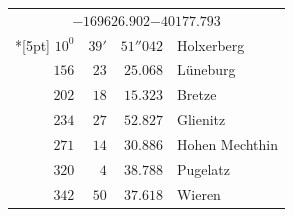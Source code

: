 \begin{longtable}{@{}rrrp{.61\linewidth}@{}}
\multicolumn{4}{c}{\(-169626.902\)\qquad\(-40177.793\)}\\*[5pt]
\(10^{0}\)&\(39'\)&\(51''042\)&\raggedright Holxerberg\tabularnewline
\(156\)&\(23\)&\(25.068\)&\raggedright Lüneburg\tabularnewline
\(202\)&\(18\)&\(15.323\)&\raggedright Bretze\tabularnewline
\(234\)&\(27\)&\(52.827\)&\raggedright Glienitz\tabularnewline
\(271\)&\(14\)&\(30.886\)&\raggedright Hohen Mechthin\tabularnewline
\(320\)&\(4\)&\(38.788\)&\raggedright Pugelatz\tabularnewline
\(342\)&\(50\)&\(37.618\)&\raggedright Wieren\tabularnewline
\end{longtable}
\endgroup
